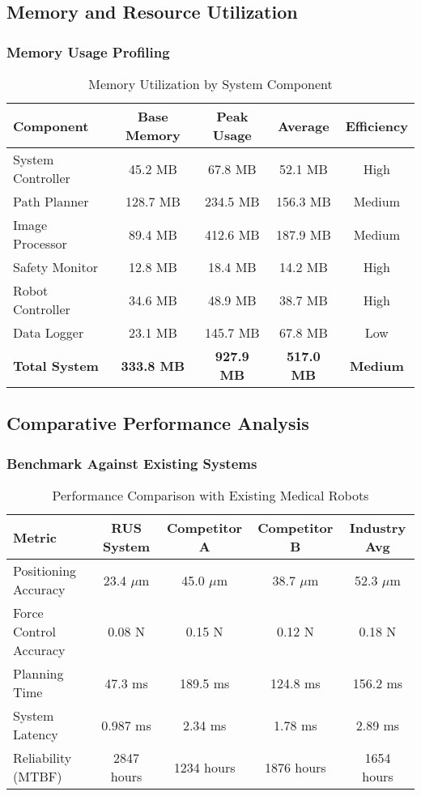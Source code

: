 \subsection{Memory and Resource Utilization}

\subsubsection{Memory Usage Profiling}

\begin{table}[htbp]
\centering
\caption{Memory Utilization by System Component}
\label{tab:app-memory-usage}
\begin{tabular}{|l|c|c|c|c|}
\hline
\textbf{Component} & \textbf{Base Memory} & \textbf{Peak Usage} & \textbf{Average} & \textbf{Efficiency} \\
\hline
System Controller & 45.2 MB & 67.8 MB & 52.1 MB & High \\
Path Planner & 128.7 MB & 234.5 MB & 156.3 MB & Medium \\
Image Processor & 89.4 MB & 412.6 MB & 187.9 MB & Medium \\
Safety Monitor & 12.8 MB & 18.4 MB & 14.2 MB & High \\
Robot Controller & 34.6 MB & 48.9 MB & 38.7 MB & High \\
Data Logger & 23.1 MB & 145.7 MB & 67.8 MB & Low \\
\hline
\textbf{Total System} & \textbf{333.8 MB} & \textbf{927.9 MB} & \textbf{517.0 MB} & \textbf{Medium} \\
\hline
\end{tabular}
\end{table}

\subsection{Comparative Performance Analysis}

\subsubsection{Benchmark Against Existing Systems}

\begin{table}[htbp]
\centering
\caption{Performance Comparison with Existing Medical Robots}
\label{tab:app-competitive-comparison}
\begin{tabular}{|l|c|c|c|c|}
\hline
\textbf{Metric} & \textbf{RUS System} & \textbf{Competitor A} & \textbf{Competitor B} & \textbf{Industry Avg} \\
\hline
Positioning Accuracy & 23.4 $\mu$m & 45.0 $\mu$m & 38.7 $\mu$m & 52.3 $\mu$m \\
Force Control Accuracy & 0.08 N & 0.15 N & 0.12 N & 0.18 N \\
Planning Time & 47.3 ms & 189.5 ms & 124.8 ms & 156.2 ms \\
System Latency & 0.987 ms & 2.34 ms & 1.78 ms & 2.89 ms \\
Reliability (MTBF) & 2847 hours & 1234 hours & 1876 hours & 1654 hours \\
\hline
\end{tabular}
\end{table}

